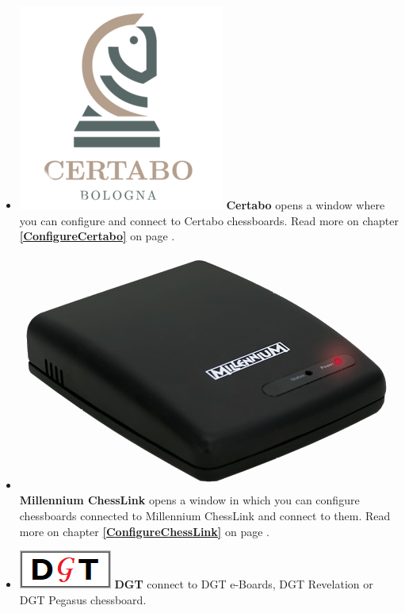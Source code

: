 \documentclass[11pt,a4paper]{article}
\begin{document}
\begin{itemize}
	\item  \includegraphics[scale=0.1]{Certabo_icon.png} \textbf{Certabo} opens a window where you can configure and connect to Certabo chessboards.  Read more on chapter \textbf{\ref{ConfigureCertabo}  } on page \pageref{ConfigureCertabo}.
	\item  \includegraphics[scale=0.05]{Millennium ChessLink.png} \textbf{Millennium ChessLink} opens a window in which you can configure chessboards connected to Millennium ChessLink and connect to them.  Read more on chapter \textbf{\ref{ConfigureChessLink}  } on page \pageref{ConfigureChessLink}.
	\item  \includegraphics[scale=0.3]{dgt48.png} \textbf{DGT} connect to DGT e-Boards, DGT Revelation or DGT Pegasus chessboard.	

\end{itemize}
\end{document}
